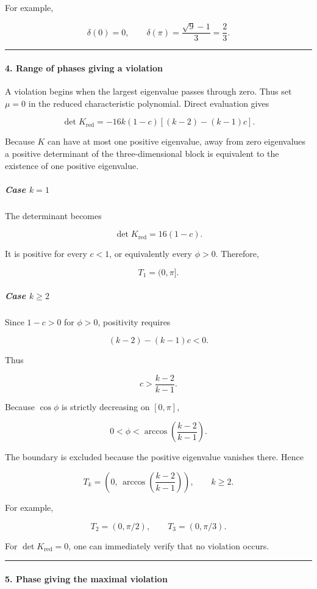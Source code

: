For example,

\[
\delta(0)=0, \qquad \delta(\pi)=\frac{\sqrt9-1}{3}=\frac23.
\]

\medskip\hrule\medskip

\paragraph*{4. Range of phases giving a violation}

A violation begins when the largest eigenvalue passes through zero. Thus set $\mu=0$ in the reduced characteristic polynomial. Direct evaluation gives

\[
\det K_{\mathrm{red}} =-16k(1-c)\left[(k-2)-(k-1)c\right].
\]

Because $K$ can have at most one positive eigenvalue, away from zero eigenvalues a positive determinant of the three-dimensional block is equivalent to the existence of one positive eigenvalue.

\subparagraph*{Case $k=1$}

The determinant becomes

\[
\det K_{\mathrm{red}}=16(1-c).
\]

It is positive for every $c<1$, or equivalently every $\phi>0$. Therefore,

\[
{T_1=(0,\pi]}.
\]

\subparagraph*{Case $k\geq2$}

Since $1-c>0$ for $\phi>0$, positivity requires

\[
(k-2)-(k-1)c<0.
\]

Thus

\[
c>\frac{k-2}{k-1}.
\]

Because $\cos\phi$ is strictly decreasing on $[0,\pi]$,

\[
0<\phi< \arccos\left(\frac{k-2}{k-1}\right).
\]

The boundary is excluded because the positive eigenvalue vanishes there. Hence

\[
{ T_k= \left( 0,\, \arccos\left(\frac{k-2}{k-1}\right) \right), \qquad k\geq2. }
\]

For example,

\[
T_2=(0,\pi/2), \qquad T_3=(0,\pi/3).
\]

For $\det K_{\mathrm{red}}=0$, one can immediately verify that no violation occurs.

\medskip\hrule\medskip

\paragraph*{5. Phase giving the maximal violation}

